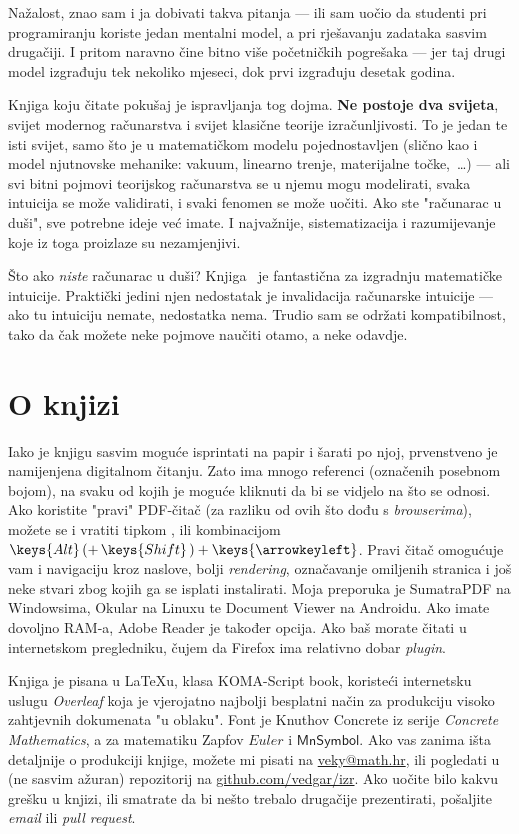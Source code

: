 Nažalost, znao sam i ja dobivati takva pitanja --- ili sam uočio da studenti pri programiranju koriste jedan mentalni model, a pri rješavanju zadataka sasvim drugačiji. I pritom naravno čine bitno više početničkih pogrešaka --- jer taj drugi model izgrađuju tek nekoliko mjeseci, dok prvi izgrađuju desetak godina.

Knjiga koju čitate pokušaj je ispravljanja tog dojma. \textbf{Ne postoje dva svijeta}, svijet modernog računarstva i svijet klasične teorije izračunljivosti. To je jedan te isti svijet, samo što je u matematičkom modelu pojednostavljen (slično kao i model njutnovske mehanike: vakuum, linearno trenje, materijalne točke,~\ldots) --- ali svi bitni pojmovi teorijskog računarstva se u njemu mogu modelirati, svaka intuicija se može validirati, i svaki fenomen se može uočiti. Ako ste "računarac u duši", sve potrebne ideje već imate. I najvažnije, sistematizacija i razumijevanje koje iz toga proizlaze su nezamjenjivi.

Što ako \emph{niste} računarac u duši? Knjiga~\cite{skr:Vuk} je fantastična za izgradnju matematičke intuicije. Praktički jedini njen nedostatak je invalidacija računarske intuicije --- ako tu intuiciju nemate, nedostatka nema. Trudio sam se održati kompatibilnost, tako da čak možete neke pojmove naučiti otamo, a neke odavdje.

\section{O knjizi}

Iako je knjigu sasvim moguće isprintati na papir i šarati po njoj, prvenstveno je namijenjena digitalnom čitanju. Zato ima mnogo referenci (označenih posebnom bojom), na svaku od kojih je moguće kliknuti da bi se vidjelo na što se odnosi. Ako koristite "pravi" PDF-čitač (za razliku od ovih što dođu s \emph{browserima}), možete se i vratiti tipkom \keys{\!$\Mapsfrom$}, ili kombinacijom $\keys{Alt}\,(+\,\keys{Shift}\,)+\keys{\arrowkeyleft}$. Pravi čitač omogućuje vam i navigaciju kroz naslove, bolji \emph{rendering}, označavanje omiljenih stranica i još neke stvari zbog kojih ga se isplati instalirati. Moja preporuka je \textsf{SumatraPDF} na Windowsima, \textsf{Okular} na Linuxu te \textsf{Document Viewer} na Androidu. Ako imate dovoljno RAM-a, \textsf{Adobe Reader} je također opcija. Ako baš morate čitati u internetskom pregledniku, čujem da \textsf{Firefox} ima relativno dobar \emph{plugin}.

Knjiga je pisana u \textsf{\LaTeX{}}u, klasa \textsf{KOMA-Script book}, koristeći internetsku uslugu \emph{Overleaf} koja je vjerojatno najbolji besplatni način za produkciju visoko zahtjevnih dokumenata "u oblaku". Font je Knuthov Concrete iz serije \emph{Concrete Mathematics}, a za matematiku Zapfov \AmS{} $Euler$ i $\mathsf{MnSymbol}$. Ako vas zanima išta detaljnije o produkciji knjige, možete mi pisati na \href{mailto:veky@math.hr}{veky@math.hr}, ili pogledati u (ne sasvim ažuran) repozitorij na \href{https://github.com/vedgar/izr}{github.com/vedgar/izr}. Ako uočite bilo kakvu grešku u knjizi, ili smatrate da bi nešto trebalo drugačije prezentirati, pošaljite \emph{email} ili \emph{pull request}.

